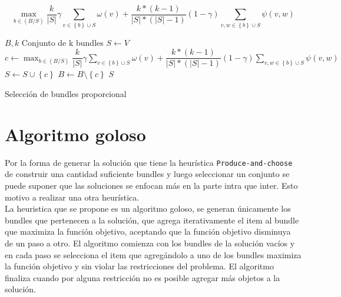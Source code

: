 \begin{equation}
\max_{b \in (B/S)}{\dfrac{k}{|S|}} \gamma \sum_{v \in \left\{b\right\} \cup S}{\omega(v)} + \dfrac{k * (k-1)}{|S| * (|S|-1)} (1-\gamma) \sum_{v,w \in \left\{b\right\} \cup S}{\psi(v,w)}
\end{equation}

\begin{algorithm}[H]
\begin{algorithmic}[1]
\REQUIRE $B,k$
\ENSURE Conjunto de k bundles
\STATE $S \leftarrow V$
\STATE $c \leftarrow \max_{b \in (B/S)}{\dfrac{k}{|S|}} \gamma \sum_{v \in \left\{b\right\} \cup S}{\omega(v)} + \dfrac{k * (k-1)}{|S| * (|S|-1)} (1-\gamma) \sum_{v,w \in \left\{b\right\} \cup S}{\psi(v,w)}$
\STATE $S \leftarrow S \cup \left\{c\right\}$
\STATE $B \leftarrow B \setminus \left\{c\right\}$
\ENDWHILE
\RETURN $S$
\end{algorithmic}
\caption{Selección de bundles proporcional}\label{alg:algSelProp}
\end{algorithm}

\section{Algoritmo goloso}
Por la forma de generar la solución que tiene la heurística \texttt{Produce-and-choose} de construir una cantidad suficiente bundles y luego seleccionar un conjunto se puede suponer que las soluciones se enfocan más en la parte intra que inter. Esto motivo a realizar una otra heurística.\\
La heuristica que se propone es un algoritmo goloso, se generan únicamente los bundles que pertenecen a la solución, que agrega iterativamente el item al bundle que maximiza la función objetivo, aceptando que la función objetivo disminuya de un paso a otro. El algoritmo comienza con los bundles de la solución vacíos y en cada paso se selecciona el item que agregándolo a uno de los bundles maximiza la función objetivo y sin violar las restricciones del problema. El algoritmo finaliza cuando por alguna restricción no es posible agregar más objetos a la solución.


